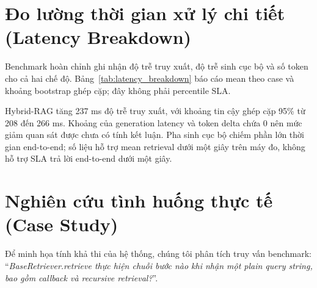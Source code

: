 \documentclass[12pt,a4paper,oneside]{report}
\begin{document}
\section{Đo lường thời gian xử lý chi tiết (Latency Breakdown)}
Benchmark hoàn chỉnh ghi nhận độ trễ truy xuất, độ trễ sinh cục bộ và số token cho cả hai chế độ. Bảng~\ref{tab:latency_breakdown} báo cáo mean theo case và khoảng bootstrap ghép cặp; đây không phải percentile SLA.

\begin{table}[H]
    \centering
    \caption{Phân rã thời gian xử lý chi tiết của hệ thống (Latency Breakdown)}
    \label{tab:latency_breakdown}
\end{table}

Hybrid-RAG tăng 237 ms độ trễ truy xuất, với khoảng tin cậy ghép cặp 95\% từ 208 đến 266 ms. Khoảng của generation latency và token delta chứa 0 nên mức giảm quan sát được chưa có tính kết luận. Pha sinh cục bộ chiếm phần lớn thời gian end-to-end; số liệu hỗ trợ mean retrieval dưới một giây trên máy đo, không hỗ trợ SLA trả lời end-to-end dưới một giây.

\section{Nghiên cứu tình huống thực tế (Case Study)}
Để minh họa tính khả thi của hệ thống, chúng tôi phân tích truy vấn benchmark: ``\textit{BaseRetriever.retrieve thực hiện chuỗi bước nào khi nhận một plain query string, bao gồm callback và recursive retrieval?}''.
\end{document}
